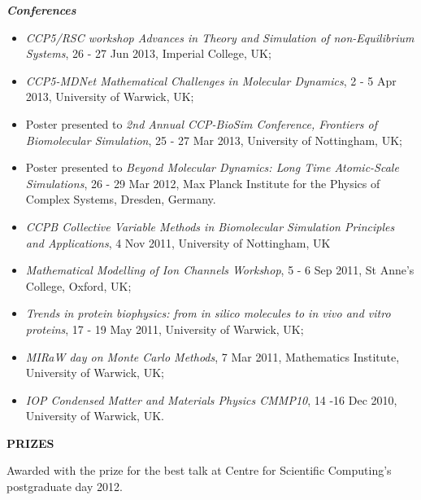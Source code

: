 \documentclass[a4paper,10pt,final]{memoir}
\newcommand{\Sep}{\vspace{1.5em}}
\newcommand{\SmallSep}{\vspace{0.5em}}
\newcommand{\CVSection}[1]
	{\Large\textbf{#1}\par
	\SmallSep\normalsize\normalfont}
\newcommand{\CVItem}[2]
	{\textit{\textbf{\color{RoyalBlue} #1}} #2}
\begin{document}
\CVItem{Conferences} 
\begin{itemize} \itemsep -2pt  %
\item \textit{CCP5/RSC workshop Advances in Theory and Simulation of non-Equilibrium Systems},
  26 - 27 Jun 2013, Imperial College, UK;
\item \textit{CCP5-MDNet Mathematical Challenges in Molecular Dynamics}, 2 - 5 Apr 2013, University
  of Warwick, UK; 
\item Poster presented to \textit{2nd Annual CCP-BioSim Conference, Frontiers of Biomolecular
  Simulation}, 25 - 27 Mar 2013, University of Nottingham, UK;
\item Poster presented to \textit{Beyond Molecular Dynamics: Long Time Atomic-Scale Simulations}, 26 - 29 Mar 2012,
  Max Planck Institute for the Physics of Complex Systems, Dresden, Germany.
\item \textit{CCPB Collective Variable Methods in Biomolecular Simulation Principles and Applications},
4 Nov 2011, University of Nottingham, UK
\item \textit{Mathematical Modelling of Ion Channels Workshop}, 5 - 6 Sep 2011, St Anne's
  College, Oxford, UK;
\item \textit{Trends in protein biophysics: from in silico molecules to in vivo and vitro
  proteins}, 17 - 19 May 2011, University of Warwick, UK;
\item \textit{MIRaW day on Monte Carlo Methods}, 7 Mar 2011, Mathematics Institute, University
  of Warwick, UK;
\item \textit{IOP Condensed Matter and Materials Physics CMMP10}, 14 -16 Dec 2010, University of Warwick, UK.
\end{itemize}

\Sep
\CVSection{PRIZES} 
Awarded with the prize for the best talk at Centre for Scientific Computing's postgraduate day 2012.
\end{document}
